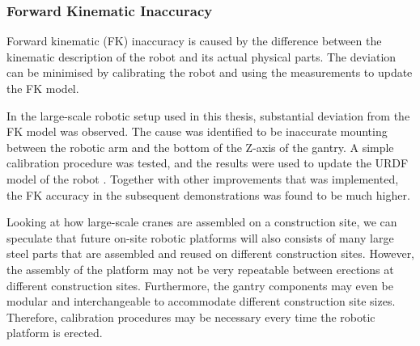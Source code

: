 \subsubsection{Forward Kinematic Inaccuracy}
\label{subsubsection:new-hypo-forward-kinematic-inaccuracy}

Forward kinematic (FK) inaccuracy is caused by the difference between the kinematic description of the robot and its actual physical parts. The deviation can be minimised by calibrating the robot \parencite{chen-gangReviewKinematicsCalibration2014, mooringFundamentalsManipulatorCalibration1991} and using the measurements to update the FK model.

In the large-scale robotic setup used in this thesis, substantial deviation from the FK model was observed. The cause was identified to be inaccurate mounting between the robotic arm and the bottom of the Z-axis of the gantry. A simple calibration procedure was tested, and the results were used to update the URDF model of the robot . Together with other improvements that was implemented, the FK accuracy in the subsequent demonstrations was found to be much higher.

Looking at how large-scale cranes are assembled on a construction site, we can speculate that future on-site robotic platforms will also consists of many large steel parts that are assembled and reused on different construction sites. However, the assembly of the platform may not be very repeatable between erections at different construction sites. Furthermore, the gantry components may even be modular and interchangeable to accommodate different construction site sizes. Therefore, calibration procedures may be necessary every time the robotic platform is erected.

